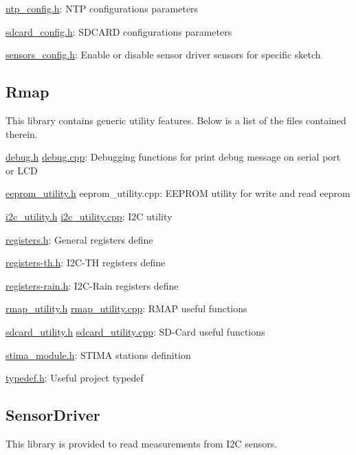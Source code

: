 \hyperlink{ntp__config_8h}{ntp\+\_\+config.\+h}\+: N\+TP configuration\textquotesingle{}s parameters

\hyperlink{sdcard__config_8h}{sdcard\+\_\+config.\+h}\+: S\+D\+C\+A\+RD configuration\textquotesingle{}s parameters

\hyperlink{sensors__config_8h}{sensors\+\_\+config.\+h}\+: Enable or disable sensor driver sensors for specific sketch\hypertarget{index_rmap}{}\subsection{Rmap}\label{index_rmap}
This library contains generic utility features. Below is a list of the files contained therein.

\hyperlink{debug_8h}{debug.\+h} \hyperlink{debug_8cpp}{debug.\+cpp}\+: Debugging functions for print debug message on serial port or L\+CD

\hyperlink{eeprom__utility_8h}{eeprom\+\_\+utility.\+h} eeprom\+\_\+utility.\+cpp\+: E\+E\+P\+R\+OM utility for write and read eeprom

\hyperlink{i2c__utility_8h}{i2c\+\_\+utility.\+h} \hyperlink{i2c__utility_8cpp}{i2c\+\_\+utility.\+cpp}\+: I2C utility

\hyperlink{registers_8h}{registers.\+h}\+: General register\textquotesingle{}s define

\hyperlink{registers-th_8h}{registers-\/th.\+h}\+: I2\+C-\/\+TH register\textquotesingle{}s define

\hyperlink{registers-rain_8h}{registers-\/rain.\+h}\+: I2\+C-\/\+Rain register\textquotesingle{}s define

\hyperlink{rmap__utility_8h}{rmap\+\_\+utility.\+h} \hyperlink{rmap__utility_8cpp}{rmap\+\_\+utility.\+cpp}\+: R\+M\+AP useful functions

\hyperlink{sdcard__utility_8h}{sdcard\+\_\+utility.\+h} \hyperlink{sdcard__utility_8cpp}{sdcard\+\_\+utility.\+cpp}\+: S\+D-\/\+Card useful functions

\hyperlink{stima__module_8h}{stima\+\_\+module.\+h}\+: S\+T\+I\+MA station\textquotesingle{}s definition

\hyperlink{typedef_8h}{typedef.\+h}\+: Useful project typedef\hypertarget{index_sensordriver}{}\subsection{Sensor\+Driver}\label{index_sensordriver}
This library is provided to read measurements from I2C sensors.

